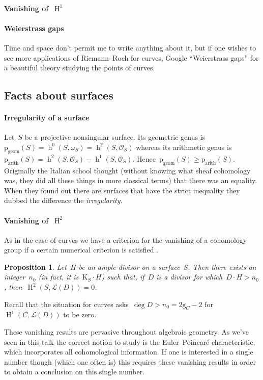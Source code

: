 \documentclass[10pt,a4paper]{article}
\theoremstyle{lecture}
\newtheorem{proposition}[theorem]{Proposition}
\DeclareMathOperator\hh{h}
\DeclareMathOperator\HH{H}
\begin{document}
\paragraph{Vanishing of~$\HH^1$}
\expand

\paragraph{Weierstrass gaps}
Time and space don't permit me to write anything about it, but if one wishes to see more applications of Riemann--Roch for curves, Google ``Weierstrass gaps'' for a beautiful theory studying the points of curves.

\subsection{Facts about surfaces}
\label{subsection:facts-surfaces}
\paragraph{Irregularity of a surface}
Let~$S$ be a projective nonsingular surface. Its geometric genus is~$\mathrm{p}_{\mathrm{geom}}(S)=\hh^0(S,\omega_S)=\hh^2(S,\mathcal{O}_S)$ whereas its arithmetic genus is~$\mathrm{p}_{\mathrm{arith}}(S)=\hh^2(S,\mathcal{O}_S)-\hh^1(S,\mathcal{O}_S)$. Hence~$\mathrm{p}_{\mathrm{geom}}(S)\geq\mathrm{p}_{\mathrm{arith}}(S)$. Originally the Italian school thought (without knowing what sheaf cohomology was, they did all these things in more classical terms) that there was an equality. When they found out there are surfaces that have the strict inequality they dubbed the difference the \emph{irregularity}.

\paragraph{Vanishing of~$\HH^2$}
As in the case of curves we have a criterion for the vanishing of a cohomology group if a certain numerical criterion is satisfied \cite[lemma V.1.7]{hartshorne-algebraic-geometry}.
\begin{proposition}
  Let~$H$ be an ample divisor on a surface~$S$. Then there exists an integer~$n_0$ (in fact, it is~$\mathrm{K}_S\cdot H$) such that, if~$D$ is a divisor for which~$D\cdot H>n_0$, then~$\HH^2(S,\mathcal{L}(D))=0$.
\end{proposition}
Recall that the situation for curves asks~$\deg D>n_0=2\mathrm{g}_C-2$ for~$\HH^1(C,\mathcal{L}(D))$ to be zero.

These vanishing results are pervasive throughout algebraic geometry. As we've seen in this talk the correct notion to study is the Euler--Poincar\'e characteristic, which incorporates all cohomological information. If one is interested in a single number though (which one often is) this requires these vanishing results in order to obtain a conclusion on this single number.

\printbibliography
\end{document}
